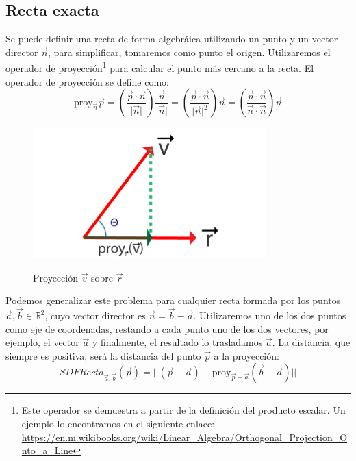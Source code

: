 \subsection{Recta exacta}
Se puede definir una recta de forma algebráica utilizando un punto y un vector director \(\Vec{n}\), para simplificar, tomaremos como punto el origen. Utilizaremos el operador de proyección\footnote{Este operador se demuestra a partir de la definición del producto escalar. Un ejemplo lo encontramos en el siguiente enlace:  \url{https://en.m.wikibooks.org/wiki/Linear_Algebra/Orthogonal_Projection_Onto_a_Line}}
para calcular el punto más cercano a la recta. El operador de proyección se define como:
\[ \text{proy}_{\Vec{n}}\Vec{p}=\left(\dfrac{\Vec{p}\cdot\Vec{n}}{\vert \Vec{n}\vert}\right)\dfrac{\Vec{n}}{\vert\Vec{n}\vert}=\left(\dfrac{\Vec{p}\cdot\Vec{n}}{\vert \Vec{n}\vert^2}\right)\Vec{n}=\left(\dfrac{\Vec{p}\cdot \Vec{n}}{\Vec{n}\cdot \Vec{n}}\right)\Vec{n}\]

\begin{figure}[H]
  \centering
  \captionsetup{justification=centering}%
  \includegraphics[width=0.8\textwidth]{secciones/imagenes/sdf/proofs/proyection.png}\label{fig:proyection}
  \caption{Proyección \(\Vec{v}\) sobre \(\Vec{r}\)}
\end{figure}

Podemos generalizar este problema para cualquier recta formada por los puntos \(\Vec{a},\Vec{b}\in\mathbb{R}^2\), cuyo vector director es 
\(\Vec{n}=\Vec{b}-\Vec{a}\). Utilizaremos uno de los dos puntos como eje de coordenadas, restando a cada punto uno de los dos vectores, por ejemplo, el vector \(\Vec{a}\) y finalmente, el resultado lo trasladamos \(\Vec{a}\). La distancia, que siempre es positiva, será la distancia del punto \(\Vec{p}\) a la proyección:
\[SDFRecta_{\Vec{a},\Vec{b}}(\Vec{p})=\vert\vert (\Vec{p}-\Vec{a}) - \text{proy}_{\Vec{p}-\Vec{a}}\left(\Vec{b}-\Vec{a}\right)\vert\vert\]

